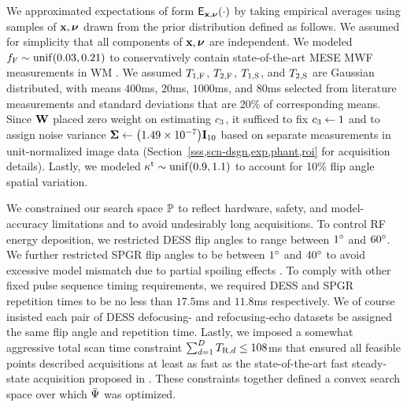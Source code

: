 We approximated expectations 
of form $\expect{\bmx,\bmnu}{\cdot}$
by taking empirical averages
using samples of $\mathbf{x},\boldsymbol{\nu}$ drawn 
from the prior distribution defined as follows.
We assumed for simplicity
that all components of $\mathbf{x},\boldsymbol{\nu}$ are independent.
We modeled 
$\ff \sim \unif{0.03, 0.21}$
to conservatively contain
state-of-the-art MESE MWF measurements in WM
\cite{zhang:15:com}.
We assumed $T_{1,\mathrm{F}}$, $T_{2,\mathrm{F}}$, $T_{1,\mathrm{S}}$, and $T_{2,\mathrm{S}}$
are Gaussian distributed,
with means $400$ms, $20$ms, $1000$ms, and $80$ms
selected from literature measurements 
\cite{mackay:94:ivv, deoni:11:com}
and standard deviations
that are $20$\% of corresponding means.
Since $\mathbf{W}$ placed zero weight 
on estimating $c_{3}$, 
it sufficed to fix $c_{3} \gets 1$
and to assign noise variance
$\bmSig \gets \paren{1.49 \times 10^{-7}}\eye{10}$
based on separate measurements
in unit-normalized image data
(\cf Section~\ref{sss,scn-dsgn,exp,phant,roi}
for acquisition details).
Lastly, 
we modeled $\stx \sim \unif{0.9,1.1}$ 
to account for 10\% flip angle spatial variation.

We constrained our search space $\mathbb{P}$
to reflect hardware, safety, and model-accuracy limitations
and to avoid undesirably long acquisitions.
To control RF energy deposition,
we restricted DESS flip angles 
to range between $1^{\circ}$ and $60^{\circ}$.
We further restricted SPGR flip angles
to be between $1^{\circ}$ and $40^{\circ}$
to avoid excessive model mismatch 
due to partial spoiling effects \cite{zur:91:sot}.
To comply with other fixed pulse sequence timing requirements,
we required DESS and SPGR repetition times
to be no less
than $17.5$ms and $11.8$ms respectively.
We of course insisted each pair
of DESS defocusing- and refocusing-echo datasets
be assigned the same flip angle and repetition time.
Lastly, 
we imposed a somewhat aggressive total scan time constraint 
$\sum_{d=1}^D T_{\mathrm{R},d} \leq 108$ms
that ensured all feasible points described acquisitions
at least as fast
as the state-of-the-art fast steady-state acquisition
proposed in \cite{deoni:11:com}.
These constraints together defined a convex search space
over which $\bar{\Psi}$ was optimized.

